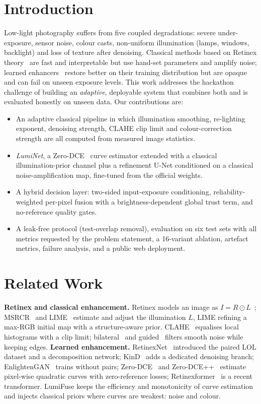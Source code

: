 \documentclass[conference]{IEEEtran}
\begin{document}
\section{Introduction}
Low-light photography suffers from five coupled degradations: severe under-exposure, sensor noise, colour casts,
non-uniform illumination (lamps, windows, backlight) and loss of texture after denoising. Classical methods based
on Retinex theory~\cite{land1971retinex,jobson1997msrcr,guo2017lime} are fast and interpretable but use hand-set
parameters and amplify noise; learned enhancers~\cite{wei2018retinexnet,zhang2019kind,jiang2021enlightengan,
guo2020zerodce,cai2023retinexformer} restore better on their training distribution but are opaque and can fail on
unseen exposure levels. This work addresses the hackathon challenge of building an \emph{adaptive}, deployable
system that combines both and is evaluated honestly on unseen data. Our contributions are:
\begin{itemize}
\item An adaptive classical pipeline in which illumination smoothing, re-lighting exponent, denoising strength, CLAHE
clip limit and colour-correction strength are all computed from measured image statistics.
\item \emph{LumiNet}, a Zero-DCE~\cite{guo2020zerodce} curve estimator extended with a classical illumination-prior
channel plus a refinement U-Net conditioned on a classical noise-amplification map, fine-tuned from the official
weights.
\item A hybrid decision layer: two-sided input-exposure conditioning, reliability-weighted per-pixel fusion with a
brightness-dependent global trust term, and no-reference quality gates.
\item A leak-free protocol (test-overlap removal), evaluation on six test sets with all metrics requested by the
problem statement, a 16-variant ablation, artefact metrics, failure analysis, and a public web deployment.
\end{itemize}

\section{Related Work}
\textbf{Retinex and classical enhancement.} Retinex models an image as $I = R \odot L$~\cite{land1971retinex};
MSRCR~\cite{jobson1997msrcr} and LIME~\cite{guo2017lime} estimate and adjust the illumination $L$, LIME refining a
max-RGB initial map with a structure-aware prior. CLAHE~\cite{zuiderveld1994clahe} equalises local histograms with a
clip limit; bilateral~\cite{tomasi1998bilateral} and guided~\cite{he2013guided} filters smooth noise while keeping
edges. \textbf{Learned enhancement.} RetinexNet~\cite{wei2018retinexnet} introduced the paired LOL dataset and a
decomposition network; KinD~\cite{zhang2019kind} adds a dedicated denoising branch; EnlightenGAN~\cite{jiang2021enlightengan}
trains without pairs; Zero-DCE~\cite{guo2020zerodce} and Zero-DCE++~\cite{li2022zerodcepp} estimate pixel-wise
quadratic curves with zero-reference losses; Retinexformer~\cite{cai2023retinexformer} is a recent transformer.
LumiFuse keeps the efficiency and monotonicity of curve estimation and injects classical priors where curves are
weakest: noise and colour.
\end{document}
